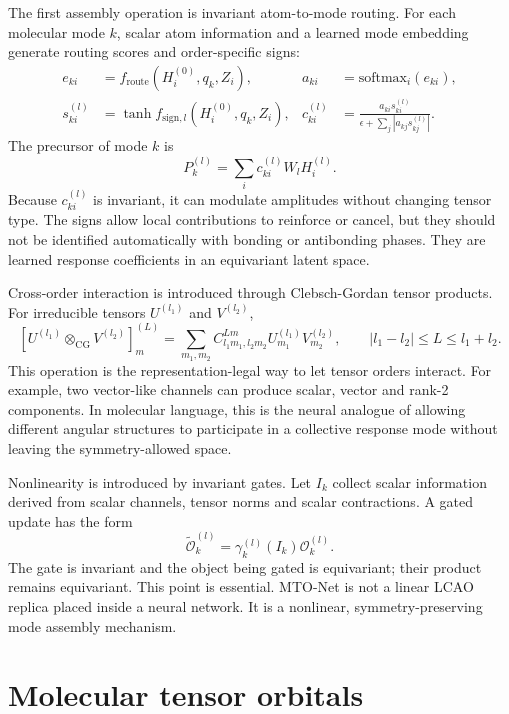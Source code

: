 \documentclass[11pt]{article}
\newcommand{\mto}{\mathcal{O}}
\newcommand{\cg}{\mathrm{CG}}
\begin{document}
The first assembly operation is invariant atom-to-mode routing. For each molecular mode $k$, scalar atom information and a learned mode embedding generate routing scores and order-specific signs:
\begin{align}
e_{ki} &= f_{\mathrm{route}}(H_i^{(0)}, q_k, Z_i), &
a_{ki} &= \mathrm{softmax}_i(e_{ki}),\\
s_{ki}^{(l)} &= \tanh f_{\mathrm{sign},l}(H_i^{(0)}, q_k, Z_i), &
c_{ki}^{(l)} &= \frac{a_{ki}s_{ki}^{(l)}}{\epsilon+\sum_j |a_{kj}s_{kj}^{(l)}|}.
\end{align}
The precursor of mode $k$ is
\begin{equation}
P_k^{(l)}=\sum_i c_{ki}^{(l)} W_l H_i^{(l)} .
\end{equation}
Because $c_{ki}^{(l)}$ is invariant, it can modulate amplitudes without changing tensor type. The signs allow local contributions to reinforce or cancel, but they should not be identified automatically with bonding or antibonding phases. They are learned response coefficients in an equivariant latent space.

Cross-order interaction is introduced through Clebsch-Gordan tensor products. For irreducible tensors $U^{(l_1)}$ and $V^{(l_2)}$,
\begin{equation}
\left[U^{(l_1)}\otimes_{\cg}V^{(l_2)}\right]^{(L)}_m
=
\sum_{m_1,m_2}
C^{Lm}_{l_1m_1,l_2m_2}
U^{(l_1)}_{m_1}V^{(l_2)}_{m_2},
\qquad
|l_1-l_2|\leq L\leq l_1+l_2 .
\end{equation}
This operation is the representation-legal way to let tensor orders interact. For example, two vector-like channels can produce scalar, vector and rank-2 components. In molecular language, this is the neural analogue of allowing different angular structures to participate in a collective response mode without leaving the symmetry-allowed space.

Nonlinearity is introduced by invariant gates. Let $I_k$ collect scalar information derived from scalar channels, tensor norms and scalar contractions. A gated update has the form
\begin{equation}
\widetilde{\mto}_k^{(l)}
=
\gamma_k^{(l)}(I_k)\mto_k^{(l)} .
\end{equation}
The gate is invariant and the object being gated is equivariant; their product remains equivariant. This point is essential. MTO-Net is not a linear LCAO replica placed inside a neural network. It is a nonlinear, symmetry-preserving mode assembly mechanism.

\section*{Molecular tensor orbitals}
\end{document}
